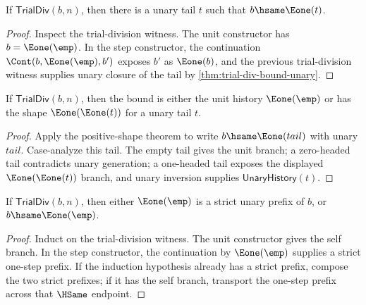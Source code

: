 \begin{theorem}
\label{thm:trial-div-bound-positive-shape}
If \(\mathsf{TrialDiv}(b,n)\), then there is a unary tail \(t\) such that
\(b\hsame\Eone(t)\).
\end{theorem}
\begin{proof}
Inspect the trial-division witness. The unit constructor has
\(b=\Eone(\emp)\). In the step constructor, the continuation
\(\Cont(b,\Eone(\emp),b')\) exposes \(b'\) as \(\Eone(b)\), and the previous
trial-division witness supplies unary closure of the tail by
\autoref{thm:trial-div-bound-unary}.
\end{proof}

\begin{theorem}
\label{thm:trialdiv-bound-unit-or-successor-shape}
If \(\mathsf{TrialDiv}(b,n)\), then the bound is either the unit history
\(\Eone(\emp)\) or has the shape \(\Eone(\Eone(t))\) for a unary tail \(t\).
\end{theorem}
\begin{proof}
Apply the positive-shape theorem to write \(b\hsame\Eone(tail)\) with unary
\(tail\). Case-analyze this tail. The empty tail gives the unit branch; a
zero-headed tail contradicts unary generation; a one-headed tail exposes the
displayed \(\Eone(\Eone(t))\) branch, and unary inversion supplies
\(\mathsf{UnaryHistory}(t)\).
\end{proof}

\begin{theorem}
\label{thm:trial-div-bound-unit-prefix-or-self}
If $\mathsf{TrialDiv}(b,n)$, then either $\Eone(\emp)$ is a strict unary prefix
of $b$, or $b\hsame\Eone(\emp)$.
\end{theorem}
\begin{proof}
Induct on the trial-division witness. The unit constructor gives the self
branch. In the step constructor, the continuation by $\Eone(\emp)$ supplies a
strict one-step prefix. If the induction hypothesis already has a strict prefix,
compose the two strict prefixes; if it has the self branch, transport the
one-step prefix across that $\HSame$ endpoint.
\end{proof}

